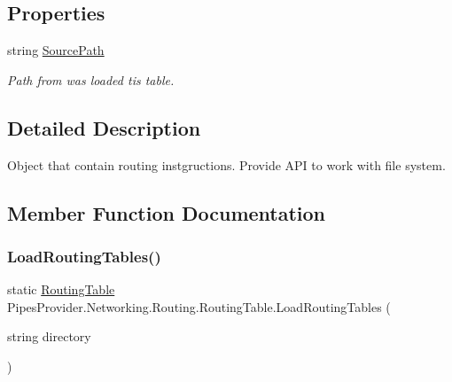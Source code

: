 \subsection*{Properties}
\begin{DoxyCompactItemize}
\item 
string \mbox{\hyperlink{class_pipes_provider_1_1_networking_1_1_routing_1_1_routing_table_af756c825762d5434f5b934a1c1b2d3eb}{Source\+Path}}
\begin{DoxyCompactList}\small\item\em Path from was loaded tis table. \end{DoxyCompactList}\end{DoxyCompactItemize}


\subsection{Detailed Description}
Object that contain routing instgructions. Provide A\+PI to work with file system. 



\subsection{Member Function Documentation}
\mbox{\label{class_pipes_provider_1_1_networking_1_1_routing_1_1_routing_table_a2ba1958b64a4d48d4d8f683042ed9cf2}} 
\subsubsection{\texorpdfstring{Load\+Routing\+Tables()}{LoadRoutingTables()}}
{\footnotesize\ttfamily static \mbox{\hyperlink{class_pipes_provider_1_1_networking_1_1_routing_1_1_routing_table}{Routing\+Table}} Pipes\+Provider.\+Networking.\+Routing.\+Routing\+Table.\+Load\+Routing\+Tables (\begin{DoxyParamCaption}\item[{string}]{directory }\end{DoxyParamCaption})\hspace{0.3cm}{\ttfamily [static]}}



